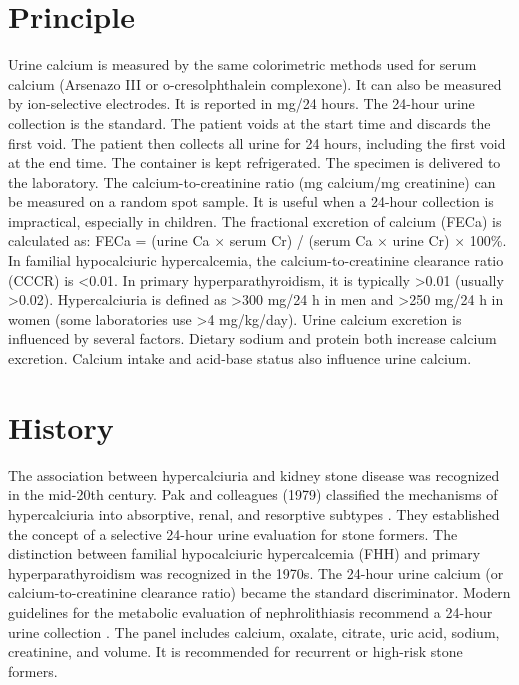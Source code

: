 \section*{Principle}
Urine calcium is measured by the same colorimetric methods used for serum calcium (Arsenazo III or o-cresolphthalein complexone). It can also be measured by ion-selective electrodes. It is reported in mg/24 hours. The 24-hour urine collection is the standard. The patient voids at the start time and discards the first void. The patient then collects all urine for 24 hours, including the first void at the end time. The container is kept refrigerated. The specimen is delivered to the laboratory. The calcium-to-creatinine ratio (mg calcium/mg creatinine) can be measured on a random spot sample. It is useful when a 24-hour collection is impractical, especially in children. The fractional excretion of calcium (FECa) is calculated as: FECa = (urine Ca $\times$ serum Cr) / (serum Ca $\times$ urine Cr) $\times$ 100\%. In familial hypocalciuric hypercalcemia, the calcium-to-creatinine clearance ratio (CCCR) is <0.01. In primary hyperparathyroidism, it is typically >0.01 (usually >0.02). Hypercalciuria is defined as >300 mg/24 h in men and >250 mg/24 h in women (some laboratories use >4 mg/kg/day). Urine calcium excretion is influenced by several factors. Dietary sodium and protein both increase calcium excretion. Calcium intake and acid-base status also influence urine calcium.

\section*{History}
The association between hypercalciuria and kidney stone disease was recognized in the mid-20th century. Pak and colleagues (1979) classified the mechanisms of hypercalciuria into absorptive, renal, and resorptive subtypes \cite{pak1979}. They established the concept of a selective 24-hour urine evaluation for stone formers. The distinction between familial hypocalciuric hypercalcemia (FHH) and primary hyperparathyroidism was recognized in the 1970s. The 24-hour urine calcium (or calcium-to-creatinine clearance ratio) became the standard discriminator. Modern guidelines for the metabolic evaluation of nephrolithiasis recommend a 24-hour urine collection \cite{worcester2010}\cite{pearle2014}. The panel includes calcium, oxalate, citrate, uric acid, sodium, creatinine, and volume. It is recommended for recurrent or high-risk stone formers.

